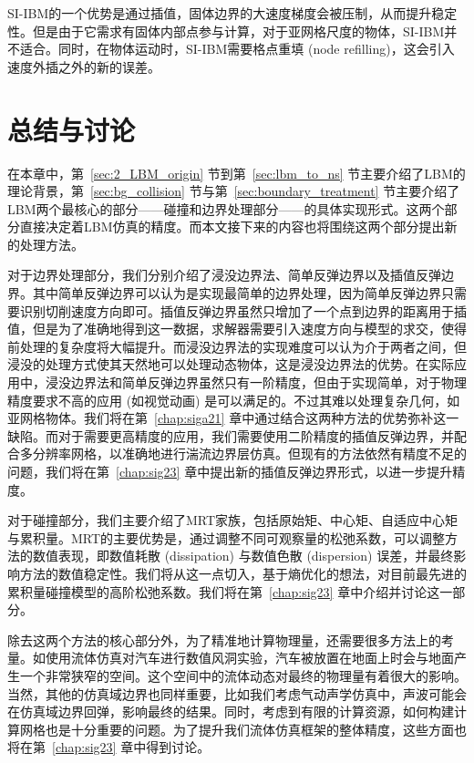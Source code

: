 SI-IBM的一个优势是通过插值，固体边界的大速度梯度会被压制，从而提升稳定性。但是由于它需求有固体内部点参与计算，对于亚网格尺度的物体，SI-IBM并不适合。同时，在物体运动时，SI-IBM需要格点重填 (node refilling)，这会引入速度外插之外的新的误差。

\section{总结与讨论}
在本章中，第~\ref{sec:2_LBM_origin} 节到第~\ref{sec:lbm_to_ns} 节主要介绍了LBM的理论背景，第~\ref{sec:bg_collision} 节与第~\ref{sec:boundary_treatment} 节主要介绍了LBM两个最核心的部分——碰撞和边界处理部分——的具体实现形式。这两个部分直接决定着LBM仿真的精度。而本文接下来的内容也将围绕这两个部分提出新的处理方法。

对于边界处理部分，我们分别介绍了浸没边界法、简单反弹边界以及插值反弹边界。其中简单反弹边界可以认为是实现最简单的边界处理，因为简单反弹边界只需要识别切削速度方向即可。插值反弹边界虽然只增加了一个点到边界的距离用于插值，但是为了准确地得到这一数据，求解器需要引入速度方向与模型的求交，使得前处理的复杂度将大幅提升。而浸没边界法的实现难度可以认为介于两者之间，但浸没的处理方式使其天然地可以处理动态物体，这是浸没边界法的优势。在实际应用中，浸没边界法和简单反弹边界虽然只有一阶精度，但由于实现简单，对于物理精度要求不高的应用 (如视觉动画) 是可以满足的。不过其难以处理复杂几何，如亚网格物体。我们将在第~\ref{chap:siga21} 章中通过结合这两种方法的优势弥补这一缺陷。而对于需要更高精度的应用，我们需要使用二阶精度的插值反弹边界，并配合多分辨率网格，以准确地进行湍流边界层仿真。但现有的方法依然有精度不足的问题，我们将在第~\ref{chap:sig23} 章中提出新的插值反弹边界形式，以进一步提升精度。

对于碰撞部分，我们主要介绍了MRT家族，包括原始矩、中心矩、自适应中心矩与累积量。MRT的主要优势是，通过调整不同可观察量的松弛系数，可以调整方法的数值表现，即数值耗散 (dissipation) 与数值色散 (dispersion) 误差，并最终影响方法的数值稳定性。我们将从这一点切入，基于熵优化的想法，对目前最先进的累积量碰撞模型的高阶松弛系数。我们将在第~\ref{chap:sig23} 章中介绍并讨论这一部分。

除去这两个方法的核心部分外，为了精准地计算物理量，还需要很多方法上的考量。如使用流体仿真对汽车进行数值风洞实验，汽车被放置在地面上时会与地面产生一个非常狭窄的空间。这个空间中的流体动态对最终的物理量有着很大的影响。当然，其他的仿真域边界也同样重要，比如我们考虑气动声学仿真中，声波可能会在仿真域边界回弹，影响最终的结果。同时，考虑到有限的计算资源，如何构建计算网格也是十分重要的问题。为了提升我们流体仿真框架的整体精度，这些方面也将在第~\ref{chap:sig23} 章中得到讨论。